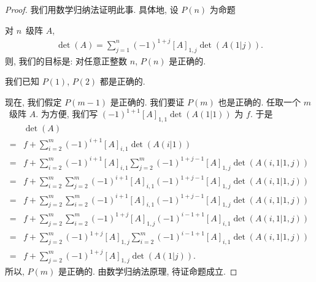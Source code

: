 \documentclass[%
    UTF8,%
    fontset=none,%
    punct=kaiming,%
    zihao=-4,%
    a4paper,%
    oneside,%
]{ctexbook}
\makeatletter
\let\emph\relax
\renewenvironment{quotation}
{\list{}{\listparindent 2\ccwd%
\itemindent\listparindent
\leftmargin\rightmargin
\parsep\z@ \@plus\p@}%
\item\relax}
{\endlist}
\makeatother
\begin{document}
\begin{proof}
    我们用数学归纳法证明此事.
    具体地, 设 \(P(n)\) 为命题
    \begin{quotation}
        对\emph{任何} \(n\)~级阵 \(A\),
        \begin{align*}
            \det {(A)} = \sum_{j = 1}^{n}
            {(-1)^{1+j} [A]_{1,j} \det {(A(1|j))}}.
        \end{align*}
    \end{quotation}
    则, 我们的目标是:
    对任意正整数 \(n\), \(P(n)\) 是正确的.

    我们已知 \(P(1)\), \(P(2)\) 都是正确的.

    现在, 我们假定 \(P(m-1)\) 是正确的.
    我们要证 \(P(m)\) 也是正确的.
    任取一个 \(m\)~级阵 \(A\).
    为方便, 我们写
    \((-1)^{1+1} [A]_{1,1} \det {(A(1|1))}\)
    为 \(f\).
    于是%
    \begin{align*}
             & \det {(A)} \\
        = {} &
        f
        +
        \sum_{i = 2}^{m} {
        (-1)^{i+1} [A]_{i,1} \det {(A(i|1))}
        }
        \tag*{(1)}
        \\
        = {} &
        f
        +
        \sum_{i = 2}^{m} {
        (-1)^{i+1} [A]_{i,1}
        \sum_{j = 2}^{m} {
        (-1)^{1+j-1} [A]_{1,j} \det {(A(i,1|1,j))}
        }
        }
        \tag*{(2)}
        \\
        = {} &
        f
        +
        \sum_{i = 2}^{m} {
        \sum_{j = 2}^{m} {
        (-1)^{i+1} [A]_{i,1}
        (-1)^{1+j-1} [A]_{1,j} \det {(A(i,1|1,j))}
        }
        }
        \tag*{(3)}
        \\
        = {} &
        f
        +
        \sum_{j = 2}^{m} {
        \sum_{i = 2}^{m} {
        (-1)^{i+1} [A]_{i,1}
        (-1)^{1+j-1} [A]_{1,j} \det {(A(i,1|1,j))}
        }
        }
        \tag*{(4)}
        \\
        = {} &
        f
        +
        \sum_{j = 2}^{m} {
        \sum_{i = 2}^{m} {
        (-1)^{1+j} [A]_{1,j}
        (-1)^{i-1+1} [A]_{i,1} \det {(A(i,1|1,j))}
        }
        }
        \tag*{(5)}
        \\
        = {} &
        f
        +
        \sum_{j = 2}^{m} {
        (-1)^{1+j} [A]_{1,j}
        \sum_{i = 2}^{m} {
        (-1)^{i-1+1} [A]_{i,1} \det {(A(i,1|1,j))}
        }
        }
        \tag*{(6)}
        \\
        = {} &
        f
        +
        \sum_{j = 2}^{m} {
        (-1)^{1+j} [A]_{1,j} \det {(A(1|j))}
        }.
        \tag*{(7)}
    \end{align*}%
    所以, \(P(m)\) 是正确的.
    由数学归纳法原理, 待证命题成立.


\end{proof}
\end{document}
